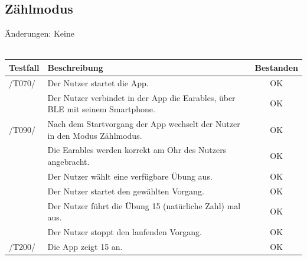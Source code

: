 \documentclass[a4paper,12pt]{article}
\newcommand{\testok}[0]{
	\cellcolor{green!25} OK
}
\begin{document}
\subsection{Zählmodus}
Änderungen: Keine
\\
\\
\begin{tabular}{ |p{1.5cm} | p{12cm} | c| }
	\hline
	\textbf{Testfall} & \textbf{Beschreibung} & \textbf{Bestanden}\\
	\hline
	/T070/ & Der Nutzer startet die App. & \testok \\
	\hline
	& Der Nutzer verbindet in der App die Earables, über BLE mit seinem Smartphone. & \testok \\
	\hline
	/T090/ & Nach dem Startvorgang der App wechselt der Nutzer in den Modus \glqq Zählmodus\grqq . & \testok \\
	\hline
	& Die Earables werden korrekt am Ohr des Nutzers angebracht. & \testok  \\
	\hline
	& Der Nutzer wählt eine verfügbare Übung aus. & \testok  \\
	\hline
	& Der Nutzer startet den gewählten Vorgang. & \testok  \\
	\hline
	& Der Nutzer führt die Übung 15 (natürliche Zahl) mal aus. & \testok  \\
	\hline
	& Der Nutzer stoppt den laufenden Vorgang. & \testok  \\
	\hline
	/T200/ & Die App zeigt 15 an. & \testok  \\
	\hline
\end{tabular}
\end{document}
